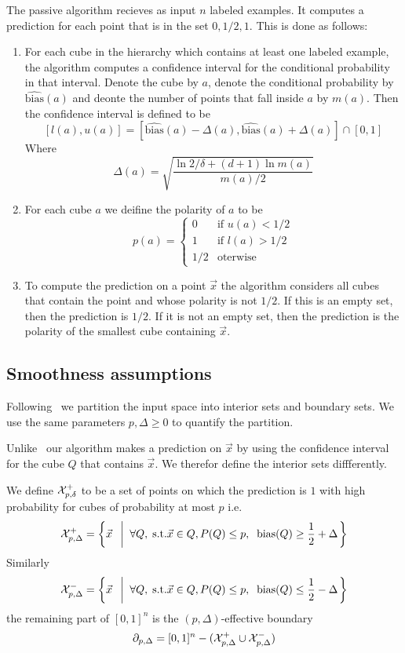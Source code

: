 \documentclass{article}
\newcommand{\x}{\vec{x}}
\newcommand{\polarity}{p}
\newcommand{\bias}{\text{bias}}
\newcommand{\empbias}{\widehat{\text{bias}}}
\begin{document}
The passive algorithm recieves as input $n$ labeled examples. It
computes a prediction for each point that is in the set
$0,1/2,1$. This is done as follows:
\begin{enumerate}
\item For each cube in the hierarchy which contains at least one
  labeled example, the algorithm computes a confidence interval for
  the conditional probability in that interval. Denote the cube by
  $a$, denote the conditional probability by $\empbias(a)$ and deonte
  the number of points that fall inside $a$ by $m(a)$. Then the
  confidence interval is defined to be 
  \[
    [l(a),u(a)] = \left[ \empbias(a)-\Delta(a), \empbias(a) + \Delta(a) \right]
    \cap [0,1]
  \]
  Where
  \[
    \Delta(a) = \sqrt{\frac{\ln 2/\delta+(d+1) \ln m(a)}{m(a)/2}}
    \]
\item For each cube $a$ we deifine the polarity of $a$ to be
  \[
  \polarity(a) =
  \begin{cases}
    0   & \text{if } u(a)<1/2\\
    1   & \text{if } l(a)>1/2\\
    1/2 & \text{oterwise}
  \end{cases}
  \]
\item To compute the prediction on a point $\x$ the algorithm
  considers all cubes that contain the point and whose polarity is not
  $1/2$. If this is an empty set, then the prediction is $1/2$. If it
  is not an empty set, then the prediction is the polarity of the
  smallest cube containing $\x$.
          

\end{enumerate}

\subsection{Smoothness assumptions}

Following~\cite{ChaudhuriDas2014} we partition the input space into
interior sets and boundary sets. We use the same parameters
$p,\Delta \geq 0$ to quantify the partition.

Unlike~\cite{ChaudhuriDas2014} our algorithm makes a prediction on
$\x$ by using the confidence interval for the cube $Q$ that contains
$\x$. We therefor define the interior sets diffferently.

\newcommand{\Set}{{\cal X}}

We define $\Set_{p,\delta}^+$ to be a set of points on which the
prediction is $1$ with high probability for cubes of probability
at most $p$ i.e.
\[
\Set_{p,\Delta}^+ = \left\{ \x\;\; \left| \;\; \forall Q,\; \mbox{s.t.} \x \in
Q, P(Q) \leq p,\;\; \bias(Q) \geq \frac{1}{2}+\Delta \right.\right\}
\]
Similarly
\[
\Set_{p,\Delta}^- = \left\{ \x\;\; \left| \;\; \forall Q,\; \mbox{s.t.} \x \in
Q, P(Q) \leq p,\;\; \bias(Q) \leq \frac{1}{2}-\Delta \right.\right\}
\]
the remaining part of $[0,1]^n$ is the $(p,\Delta)$-effective boundary
\[
\partial_{p,\Delta} = [0,1]^n - (\Set_{p,\Delta}^+ \cup \Set_{p,\Delta}^-)
\]
\end{document}
